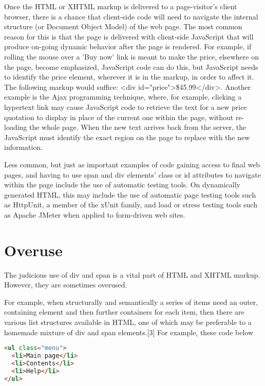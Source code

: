 Once the HTML or XHTML markup is delivered to a page-visitor's client browser, there is a chance that client-side code will need to navigate the internal structure (or Document Object Model) of the web page. The most common reason for this is that the page is delivered with client-side JavaScript that will produce on-going dynamic behavior after the page is rendered. For example, if rolling the mouse over a 'Buy now' link is meant to make the price, elsewhere on the page, become emphasized, JavaScript code can do this, but JavaScript needs to identify the price element, wherever it is in the markup, in order to affect it. The following markup would suffice: <div id="price">\$45.99</div>. Another example is the Ajax programming technique, where, for example, clicking a hypertext link may cause JavaScript code to retrieve the text for a new price quotation to display in place of the current one within the page, without re-loading the whole page. When the new text arrives back from the server, the JavaScript must identify the exact region on the page to replace with the new information.

Less common, but just as important examples of code gaining access to final web pages, and having to use span and div elements' class or id attributes to navigate within the page include the use of automatic testing tools. On dynamically generated HTML, this may include the use of automatic page testing tools such as HttpUnit, a member of the xUnit family, and load or stress testing tools such as Apache JMeter when applied to form-driven web sites.


\section{Overuse}

The judicious use of div and span is a vital part of HTML and XHTML markup. However, they are sometimes overused.

For example, when structurally and semantically a series of items need an outer, containing element and then further containers for each item, then there are various list structures available in HTML, one of which may be preferable to a homemade mixture of div and span elements.[3]
For example, these code below

\begin{lstlisting}[language=HTML]
<ul class="menu">
  <li>Main page</li>
  <li>Contents</li>
  <li>Help</li>
</ul>
\end{lstlisting}

